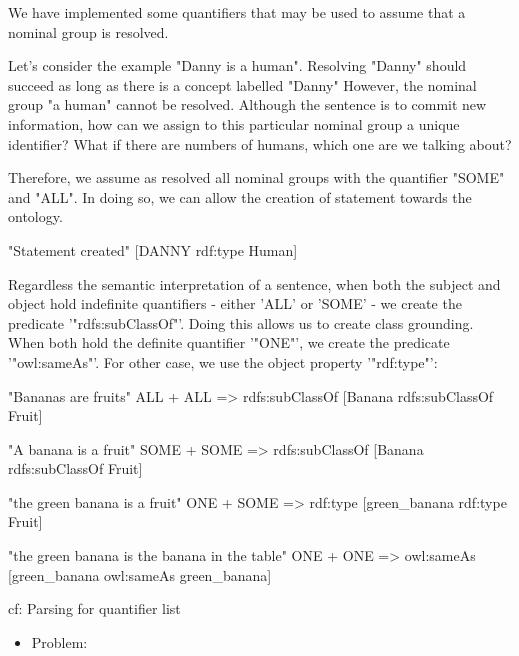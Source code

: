 \documentclass[twoside,a4paper,10pt]{report}
\begin{document}
We have implemented some quantifiers that may be used to assume that a nominal group is resolved.

Let's consider the example "Danny is a human". Resolving "Danny" should succeed as long as there is a concept labelled "Danny"
However, the nominal group "a human" cannot be resolved. Although the sentence is to commit new information, how can we assign to this particular nominal group a unique identifier? What if there are numbers of humans, which one are we talking about? 

Therefore, we assume as resolved all nominal groups with the quantifier "SOME" and "ALL". In doing so, we can allow the creation of statement towards the ontology.



\small
\begin{verbatimtab}
  "Statement created"
  [DANNY rdf:type Human]
\end{verbatimtab}
\normalsize
Regardless the semantic interpretation of a sentence, when both the subject and object hold indefinite quantifiers - either 'ALL' or 'SOME' - we create the predicate '"rdfs:subClassOf"'.
Doing this allows us to create class grounding. When both hold the definite quantifier '"ONE"', we create the predicate '"owl:sameAs"'.  For other case, we use the object property '"rdf:type"':


\small
\begin{verbatimtab}
  
  "Bananas         are             fruits"
    ALL             +               ALL                   => rdfs:subClassOf
  [Banana     rdfs:subClassOf      Fruit]
  
  "A banana        is               a fruit"
    SOME           +                 SOME                 => rdfs:subClassOf
  [Banana     rdfs:subClassOf       Fruit]
  
  "the green banana    is           a fruit"
     ONE               +             SOME                 => rdf:type
  [green_banana    rdf:type         Fruit]
  
  "the green banana     is       the banana in the table"
      ONE               +                ONE              => owl:sameAs
  [green_banana    owl:sameAs       green_banana]
  
  cf: Parsing for quantifier list
  
\end{verbatimtab}
\normalsize

\begin{itemize}
    \item  Problem:
\end{itemize}
\end{document}
